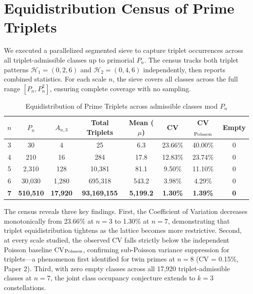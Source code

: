 \documentclass[11pt]{article}
\begin{document}
\section{Equidistribution Census of Prime Triplets}

We executed a parallelized segmented sieve to capture triplet occurrences across all triplet-admissible classes up to primorial $P_n$. The census tracks both triplet patterns $\mathcal{H}_1 = (0, 2, 6)$ and $\mathcal{H}_2 = (0, 4, 6)$ independently, then reports combined statistics. For each scale $n$, the sieve covers all classes across the full range $[P_n, P_n^2]$, ensuring complete coverage with no sampling.

\begin{table}[h]
\centering
\caption{Equidistribution of Prime Triplets across admissible classes mod $P_n$}
\label{tab:triplet_census}
\begin{tabular}{cccccccc}
\toprule
$n$ & $P_n$ & $A_{n,3}$ & Total Triplets & Mean ($\mu$) & CV & CV$_{\rm Poisson}$ & Empty \\
\midrule
3 & 30 & 4 & 25 & 6.3 & 23.66\% & 40.00\% & 0 \\
4 & 210 & 16 & 284 & 17.8 & 12.83\% & 23.74\% & 0 \\
5 & 2{,}310 & 128 & 10{,}381 & 81.1 & 9.50\% & 11.10\% & 0 \\
6 & 30{,}030 & 1{,}280 & 695{,}318 & 543.2 & 3.98\% & 4.29\% & 0 \\
\textbf{7} & \textbf{510{,}510} & \textbf{17{,}920} & \textbf{93{,}169{,}155} & \textbf{5{,}199.2} & \textbf{1.30\%} & \textbf{1.39\%} & \textbf{0} \\
\bottomrule
\end{tabular}

\vspace{0.5em}
\end{table}

The census reveals three key findings. First, the Coefficient of Variation decreases monotonically from 23.66\% at $n=3$ to 1.30\% at $n=7$, demonstrating that triplet equidistribution tightens as the lattice becomes more restrictive. Second, at every scale studied, the observed CV falls strictly below the independent Poisson baseline CV$_{\rm Poisson}$, confirming sub-Poisson variance suppression for triplets---a phenomenon first identified for twin primes at $n=8$ (CV = 0.15\%, Paper 2). Third, with zero empty classes across all 17{,}920 triplet-admissible classes at $n=7$, the joint class occupancy conjecture extends to $k=3$ constellations.
\end{document}
